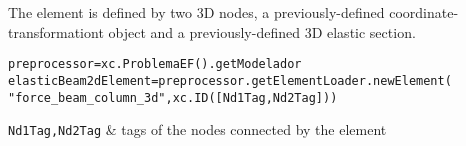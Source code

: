 The element is defined by two 3D nodes, a previously-defined coordinate-transformationt object and a previously-defined 3D elastic section.
\begin{verbatim}
preprocessor=xc.ProblemaEF().getModelador
elasticBeam2dElement=preprocessor.getElementLoader.newElement(
"force_beam_column_3d",xc.ID([Nd1Tag,Nd2Tag]))
\end{verbatim}
\begin{paramFuncTable}
{\tt Nd1Tag,Nd2Tag} & tags of the nodes connected by the element\\
\end{paramFuncTable}
\begin{paramClassTable}
\ElementParam{}
\ElementOneDParam{}
\rhoX{}
\end{paramClassTable}

\begin{methodsTable}
\ElementMeth{}
\ElementOneDMeth{}
\BeamColumnWithSectionFDMeth{}
\getVDirEjeFuerteLocales{} \\
\getVDirEjeDebilLocales{} \\
\getAnguloEjeFuerte{} \\
\getAnguloEjeDebil{} \\
\getVDirEjeFuerteGlobales{} \\
\getVDirEjeDebilGlobales{} \\
\end{methodsTable}
